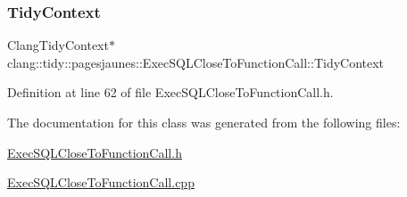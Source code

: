 \subsubsection{\texorpdfstring{Tidy\+Context}{TidyContext}}
{\footnotesize\ttfamily Clang\+Tidy\+Context$\ast$ clang\+::tidy\+::pagesjaunes\+::\+Exec\+S\+Q\+L\+Close\+To\+Function\+Call\+::\+Tidy\+Context}



Definition at line 62 of file Exec\+S\+Q\+L\+Close\+To\+Function\+Call.\+h.



The documentation for this class was generated from the following files\+:\begin{DoxyCompactItemize}
\item 
\hyperlink{_exec_s_q_l_close_to_function_call_8h}{Exec\+S\+Q\+L\+Close\+To\+Function\+Call.\+h}\item 
\hyperlink{_exec_s_q_l_close_to_function_call_8cpp}{Exec\+S\+Q\+L\+Close\+To\+Function\+Call.\+cpp}\end{DoxyCompactItemize}
